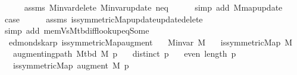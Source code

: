 \begin{isabellebody}
\ \ \ \ \isamarkupfalse%
\ assms{\isacharparenleft}{\kern0pt}{}{\isacharparenright}{\kern0pt}\ M{\isachardot}{\kern0pt}invar{\isacharunderscore}{\kern0pt}delete\ M{\isachardot}{\kern0pt}invar{\isacharunderscore}{\kern0pt}update\ neq{\isacharparenleft}{\kern0pt}{}{\isacharparenright}{\kern0pt}\isanewline
\ \ \ \ \isamarkupfalse%
\ {\isacharparenleft}{\kern0pt}simp\ add{\isacharcolon}{\kern0pt}\ M{\isachardot}{\kern0pt}map{\isacharunderscore}{\kern0pt}update{\isacharparenright}{\kern0pt}\isanewline
\ \ \isamarkupfalse%
\ {\isacharquery}{\kern0pt}case\isanewline
\ \ \ \ \isamarkupfalse%
\ assms\ is{\isacharunderscore}{\kern0pt}symmetric{\isacharunderscore}{\kern0pt}Map{\isacharunderscore}{\kern0pt}update{\isacharunderscore}{\kern0pt}update{\isacharunderscore}{\kern0pt}delete\isanewline
\ \ \ \ \isamarkupfalse%
\ {\isacharparenleft}{\kern0pt}simp\ add{\isacharcolon}{\kern0pt}\ mem{\isacharunderscore}{\kern0pt}Vs{\isacharunderscore}{\kern0pt}M{\isacharunderscore}{\kern0pt}tbd{\isacharunderscore}{\kern0pt}iff{\isacharunderscore}{\kern0pt}lookup{\isacharunderscore}{\kern0pt}eq{\isacharunderscore}{\kern0pt}Some{\isacharparenright}{\kern0pt}\isanewline
{}\isamarkupfalse%
%
\endisatagproof
{\isafoldproof}%
%
\isadelimproof
\isanewline
%
\endisadelimproof
%
\isadeliminvisible
\isanewline
%
\endisadeliminvisible
%
\isataginvisible
{}\isamarkupfalse%
\ {\isacharparenleft}{\kern0pt}\ edmonds{\isacharunderscore}{\kern0pt}karp{\isacharparenright}{\kern0pt}\ is{\isacharunderscore}{\kern0pt}symmetric{\isacharunderscore}{\kern0pt}Map{\isacharunderscore}{\kern0pt}augment{\isacharcolon}{\kern0pt}\isanewline
\ \ \ {\isachardoublequoteopen}M{\isachardot}{\kern0pt}invar\ M{\isachardoublequoteclose}\isanewline
\ \ \ {\isachardoublequoteopen}is{\isacharunderscore}{\kern0pt}symmetric{\isacharunderscore}{\kern0pt}Map\ M{\isachardoublequoteclose}\isanewline
\ \ \ {\isachardoublequoteopen}augmenting{\isacharunderscore}{\kern0pt}path\ {\isacharparenleft}{\kern0pt}M{\isacharunderscore}{\kern0pt}tbd\ M{\isacharparenright}{\kern0pt}\ p{\isachardoublequoteclose}\isanewline
\ \ \ {\isachardoublequoteopen}distinct\ p{\isachardoublequoteclose}\isanewline
\ \ \ {\isachardoublequoteopen}even\ {\isacharparenleft}{\kern0pt}length\ p{\isacharparenright}{\kern0pt}{\isachardoublequoteclose}\isanewline
\ \ \ {\isachardoublequoteopen}is{\isacharunderscore}{\kern0pt}symmetric{\isacharunderscore}{\kern0pt}Map\ {\isacharparenleft}{\kern0pt}augment\ M\ p{\isacharparenright}{\kern0pt}{\isachardoublequoteclose}%

\end{isabellebody}
